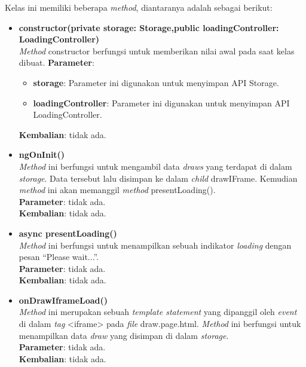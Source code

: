 \begin{enumerate}
	Kelas ini memiliki beberapa \textit{method}, diantaranya adalah sebagai berikut:
	
	\begin{itemize}
		\item \textbf{constructor(private storage: Storage,public loadingController: LoadingController)}\\
			\textit{Method} constructor berfungsi untuk memberikan nilai awal pada saat kelas dibuat.
			\textbf{Parameter}:
			\begin{itemize}
				\item \textbf{storage}: Parameter ini digunakan untuk menyimpan API Storage.
				\item \textbf{loadingController}: Parameter ini digunakan untuk menyimpan API LoadingController.
			\end{itemize}
			\textbf{Kembalian}: tidak ada.

		\newpage			
			
		\item \textbf{ngOnInit()} \\
			\textit{Method} ini berfungsi untuk mengambil data \textit{draws} yang terdapat di dalam \textit{storage}. Data tersebut lalu disimpan ke dalam \textit{child} drawIFrame. Kemudian \textit{method} ini akan memanggil \textit{method} presentLoading(). \\
			\textbf{Parameter}: tidak ada. \\
			\textbf{Kembalian}: tidak ada.
		
		\item \textbf{async presentLoading()}\\
			\textit{Method} ini berfungsi untuk menampilkan sebuah indikator \textit{loading} dengan pesan ``Please wait...''. \\ 
			\textbf{Parameter}: tidak ada. \\
			\textbf{Kembalian}: tidak ada.
			
		\item \textbf{onDrawIframeLoad()}\\
			\textit{Method} ini merupakan sebuah \textit{template statement} yang dipanggil oleh \textit{event} di dalam \textit{tag} <iframe> pada \textit{file} draw.page.html. \textit{Method} ini berfungsi untuk menampilkan data \textit{draw} yang disimpan di dalam \textit{storage}. \\
			\textbf{Parameter}: tidak ada. \\
			\textbf{Kembalian}: tidak ada.
	\end{itemize}
	

\end{enumerate}
